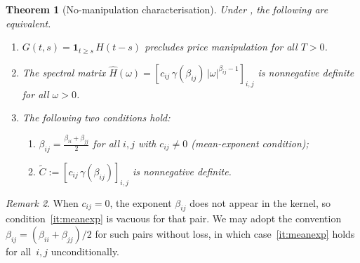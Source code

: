 \documentclass[12pt]{article}
\newtheorem{theorem}{Theorem}[section]
\theoremstyle{definition}
\theoremstyle{remark}
\newtheorem{remark}[theorem]{Remark}
\newcommand{\bC}{\widetilde{C}}
\begin{document}
\begin{theorem}[No-manipulation characterisation]\label{thm:main}
Under , the following are equivalent.
\begin{enumerate}[label=\textup{(\roman*)},nosep]
  \item\label{it:nomanip}
    $G(t,s)=\mathbf{1}_{t\ge s}\,H(t-s)$ precludes price manipulation
    for all $T>0$.
  \item\label{it:Fourier}
    The spectral matrix
    $\widehat{H}(\omega) = [c_{ij}\,\gamma(\beta_{ij})\,|\omega|^{\beta_{ij}-1}]_{i,j}$
    is nonnegative definite for all $\omega>0$.
  \item\label{it:conditions}
    The following two conditions hold:
    \begin{enumerate}[label=\textup{(\alph*)},nosep]
      \item\label{it:meanexp}
        $\beta_{ij} = \frac{\beta_{ii}+\beta_{jj}}{2}$ for all $i,j$
          with $c_{ij}\neq 0$
        \textup{(mean-exponent condition);}
      \item\label{it:Ctilde}
        $\bC := [c_{ij}\,\gamma(\beta_{ij})]_{i,j}$ is nonnegative definite.
    \end{enumerate}
\end{enumerate}
\end{theorem}

\begin{remark}\label{rem:vacuous}
When $c_{ij}=0$, the exponent $\beta_{ij}$ does not appear in the kernel, so
condition~\ref{it:meanexp} is vacuous for that pair.
We may adopt the convention $\beta_{ij}=(\beta_{ii}+\beta_{jj})/2$ for such pairs
without loss, in which case~\ref{it:meanexp} holds for all~$i,j$ unconditionally.
\end{remark}
\end{document}
